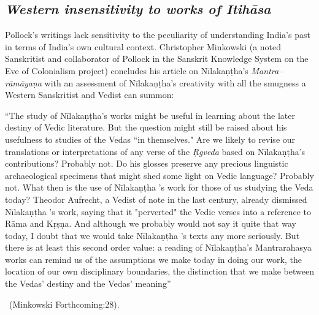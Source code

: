 \subsection*{\textit{Western insensitivity to works of Itihāsa}}

Pollock’s writings lack sensitivity to the peculiarity of understanding India’s past in terms of India’s own cultural context. Christopher Minkowski (a noted Sanskritist and collaborator of Pollock in the Sanskrit Knowledge System on the Eve of Colonialism project) concludes his article on Nīlakaṇṭha’s \textit{Mantra–rāmāyaṇa} with an assessment of Nīlakaṇṭha’s creativity with all the smugness a Western Sanskritist and Vedist can summon:

\begin{myquote}
“The study of Nīlakaṇṭha's works might be useful in learning about the later destiny of Vedic literature. But the question might still be raised about his usefulness to studies of the Vedas “in themselves." Are we likely to revise our translations or interpretations of any verse of the \textit{Ṛgveda} based on Nīlakaṇṭha's contributions? Probably not. Do his glosses preserve any precious linguistic archaeological specimens that might shed some light on Vedic language? Probably not. What then is the use of Nīlakaṇṭha 's work for those of us studying the Veda today? Theodor Aufrecht, a Vedist of note in the last century, already dismissed Nīlakaṇṭha 's work, saying that it "perverted" the Vedic verses into a reference to Rāma and Kṛṣṇa. And although we probably would not say it quite that way today, I doubt that we would take Nīlakaṇṭha 's texts any more seriously. But there is at least this second order value: a reading of Nīlakaṇṭha's Mantrarahasya works can remind us of the assumptions we make today in doing our work, the location of our own disciplinary boundaries, the distinction that we make between the Vedas' destiny and the Vedas' meaning”

~\hfill (Minkowski Forthcoming:28).
\end{myquote}

